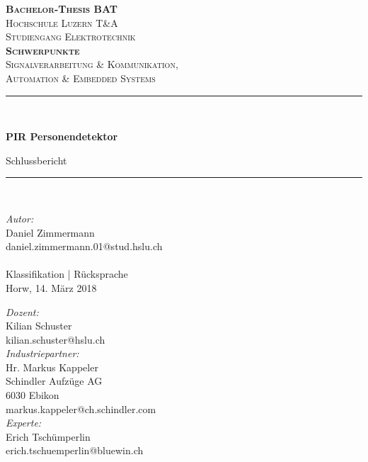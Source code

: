 \begin{titlepage}	
	\begin{center}	
		
		\textsc{\bfseries \LARGE Bachelor-Thesis BAT }\\[1.0cm]
		
		\textsc{\Large Hochschule Luzern T\&A}\\[0.5cm]
		
		\textsc{Studiengang Elektrotechnik}\\[1.0cm]
		
				\textsc{\bfseries Schwerpunkte}\\[0.2cm]
		
		\textsc{	Signalverarbeitung \& Kommunikation, \\
			Automation \& Embedded Systems}\\[0.5cm]
		
		\newcommand{\HRule}{\rule{\linewidth}{0.5mm}}
		\HRule \\[1.0cm]
		{   \Huge \bfseries PIR Personendetektor\\
			\large \vspace{\baselineskip}
			
			\large Schlussbericht\\[1.0cm]
			
			\HRule \\[1.0cm]
			\large \vspace{\baselineskip}
		}
		\begingroup
		\parfillskip=0pt
		\large
		
		\begin{minipage}[t]{0.48\textwidth}
			\raggedright						
			\emph{Autor:}\\
			Daniel Zimmermann\\
			daniel.zimmermann.01@stud.hslu.ch\\
			\hfill \break
			\\[4.4cm]
			{\large Klassifikation | Rücksprache\\ 
				Horw, 
				14. März 2018}
		\end{minipage}%
		\hfill
		\begin{minipage}[t]{0.48\textwidth}
			\raggedleft
			\emph{Dozent:} \\
			Kilian Schuster \\
			kilian.schuster@hslu.ch\\[1.0cm]
			\emph{Industriepartner:} \\
			Hr. Markus Kappeler \\
			Schindler Aufzüge AG \\
			6030 Ebikon\\
			markus.kappeler@ch.schindler.com\\[1.0cm]
			\emph{Experte:}\\
			Erich Tschümperlin\\
			erich.tschuemperlin@bluewin.ch\\
		\end{minipage}%
		\par\endgroup
		\hfill
		
	\end{center}	
\end{titlepage}
